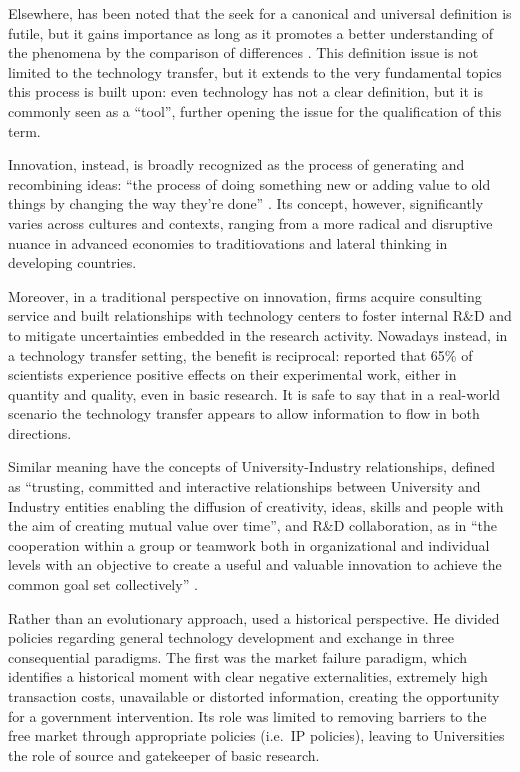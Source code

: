 Elsewhere, has been noted that the seek for a canonical and universal definition is futile, but it gains importance as long as it promotes a better understanding of the phenomena by the comparison of differences \citep{Bozeman2000}. This definition issue is not limited to the technology transfer, but it extends to the very fundamental topics this process is built upon: even technology has not a clear definition, but it is commonly seen as a \enquote{tool}, further opening the issue for the qualification of this term. 

Innovation, instead, is broadly recognized as the process of generating and recombining ideas: \enquote{the process of doing something new or adding value to old things by changing the way they're done} \citep{Baskaran2016}. Its concept, however, significantly varies across cultures and contexts, ranging from a more radical and disruptive nuance in advanced economies to traditiovations and lateral thinking in developing countries.

Moreover, in a traditional perspective on innovation, firms acquire consulting service and built relationships with technology centers to foster internal R\&D and to mitigate uncertainties embedded in the research activity. Nowadays instead, in a technology transfer setting, the benefit is reciprocal: \citet{Siegel2003a} reported that 65\% of scientists experience positive effects on their experimental work, either in quantity and quality, even in basic research. It is safe to say that in a real-world scenario the technology transfer appears to allow information to flow in both directions.

Similar meaning have the concepts of University-Industry relationships, defined as \enquote{trusting, committed and interactive relationships between University and Industry entities enabling the diffusion of creativity, ideas, skills and people with the aim of creating mutual value over time}, and R\&D collaboration, as in \enquote{the cooperation within a group or teamwork both in organizational and individual levels with an objective to create a useful and valuable innovation to achieve the common goal set collectively} \citep{Frasquet2012}. 

Rather than an evolutionary approach, \citet{Bozeman2000} used a historical perspective. He divided policies regarding general technology development and exchange in three consequential paradigms. The first was the market failure paradigm, which identifies a historical moment with clear negative externalities, extremely high transaction costs, unavailable or distorted information, creating the opportunity for a government intervention. Its role was limited to removing barriers to the free market through appropriate policies (i.e.\ IP policies), leaving to Universities the role of source and gatekeeper of basic research.

